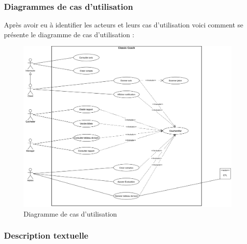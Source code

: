     \subsubsection[Diagrammes de cas d’utilisation]{Diagrammes de cas d’utilisation}
    Après avoir eu à identifier les acteurs et leurs cas d’utilisation
    voici comment se présente le diagramme de cas d’utilisation :
        \begin{figure}[H]
            \centering
            \includegraphics[width=150mm]{images/dcu_systeme.png}
            \caption{Diagramme de cas d’utilisation}
            \label{fig:dcu}
        \end{figure}

    \subsubsection[Description textuelle]{Description textuelle}

